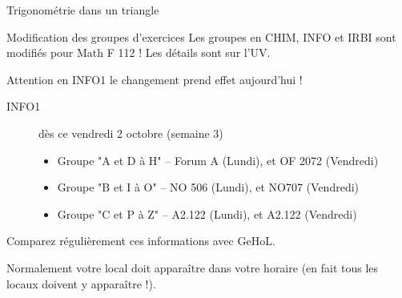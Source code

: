 \documentclass[french,t,handout,xcolor=svgnames]{beamer}
\begin{document}
\begin{frame}{Trigonométrie dans un triangle}
  
\end{frame}
\begin{frame}{}
  
\end{frame}
\begin{frame}{Modification des groupes d'exercices}
  Les groupes en CHIM, INFO et IRBI sont modifiés pour Math F 112 ! Les détails sont sur l'UV.

  Attention en INFO1 le changement prend effet aujourd'hui !
  \begin{description}
  \item[{INFO1}] \alert{dès ce vendredi 2 octobre} (semaine 3)
    \begin{itemize}
    \item Groupe "A et D à H" -- Forum A (Lundi), et OF 2072 (Vendredi)
    \item Groupe "B et I à O" -- NO 506 (Lundi), et NO707 (Vendredi)
    \item Groupe "C et P à Z" -- A2.122 (Lundi), et A2.122 (Vendredi)
    \end{itemize}
  \end{description}

  Comparez régulièrement ces informations avec GeHoL.

  Normalement votre local doit apparaître dans votre horaire (en fait tous les locaux doivent y apparaître !).
\end{frame}
\end{document}
